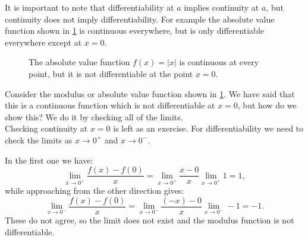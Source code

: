 It is important to note that differentiability at $a$ implies continuity at $a$, but continuity does not imply differentiability.  For example the absolute value function shown in \cref{fig: abs function} is continuous everywhere, but is only differentiable everywhere except at $x=0$.

\begin{figure}[htbp]
    \centering
{}
    \caption{The absolute value function $f(x)=\vert x\vert$ is continuous at every point, but it is not differentiable at the point $x=0$.}
        \label{fig: abs function}
\end{figure}

\begin{ex}
Consider the modulus or absolute value function shown in \cref{fig: abs function}. We have said that this is a continuous function which is not differentiable at $x=0$, but how do we show this? We do it by checking all of the limits.\\

Checking continuity at $x=0$ is left as an exercise. For differentiability we need to check the limits as $x\to 0^{+}$ and $x\to 0^{-}$. 

In the first one we have:
\begin{equation*}
\lim_{x\to 0^{+}}\frac{f(x)-f(0)}{x}=\lim_{x\to 0^{+}}\frac{x-0}{x}\lim_{x\to 0^{+}}1=1,
\end{equation*}
while approaching from the other direction gives:
\begin{equation*}
\lim_{x\to 0^{-}}\frac{f(x)-f(0)}{x}=\lim_{x\to 0^{-}}\frac{(-x)-0}{x}\lim_{x\to 0^{-}}-1=-1.
\end{equation*}
These do not agree, so the limit does not exist and the modulus function is not differentiable.
\end{ex}

